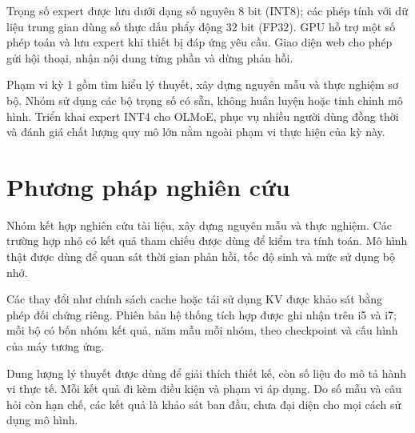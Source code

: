 Trọng số expert được lưu dưới dạng số nguyên 8 bit (INT8); các phép tính với dữ liệu trung gian dùng số thực dấu phẩy động 32 bit (FP32). GPU hỗ trợ một số phép toán và lưu expert khi thiết bị đáp ứng yêu cầu. Giao diện web cho phép gửi hội thoại, nhận nội dung từng phần và dừng phản hồi.

Phạm vi kỳ 1 gồm tìm hiểu lý thuyết, xây dựng nguyên mẫu và thực nghiệm sơ bộ. Nhóm sử dụng các bộ trọng số có sẵn, không huấn luyện hoặc tinh chỉnh mô hình. Triển khai expert INT4 cho OLMoE, phục vụ nhiều người dùng đồng thời và đánh giá chất lượng quy mô lớn nằm ngoài phạm vi thực hiện của kỳ này.

\section{Phương pháp nghiên cứu}

Nhóm kết hợp nghiên cứu tài liệu, xây dựng nguyên mẫu và thực nghiệm. Các trường hợp nhỏ có kết quả tham chiếu được dùng để kiểm tra tính toán. Mô hình thật được dùng để quan sát thời gian phản hồi, tốc độ sinh và mức sử dụng bộ nhớ.

Các thay đổi như chính sách cache hoặc tái sử dụng KV được khảo sát bằng phép đối chứng riêng. Phiên bản hệ thống tích hợp được ghi nhận trên i5 và i7; mỗi bộ có bốn nhóm kết quả, năm mẫu mỗi nhóm, theo checkpoint và cấu hình của máy tương ứng.

Dung lượng lý thuyết được dùng để giải thích thiết kế, còn số liệu đo mô tả hành vi thực tế. Mỗi kết quả đi kèm điều kiện và phạm vi áp dụng. Do số mẫu và câu hỏi còn hạn chế, các kết quả là khảo sát ban đầu, chưa đại diện cho mọi cách sử dụng mô hình.
